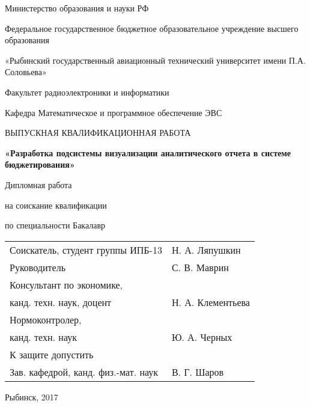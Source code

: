 \documentclass[a4paper]{extarticle}
\begin{document}
\begin{titlepage}
\centering
\large Министерство образования и науки РФ\par
\large Федеральное государственное бюджетное образовательное учреждение высшего образования\par
\large «Рыбинский государственный авиационный технический университет имени П.А. Соловьева»\par\vspace{1cm}

\large Факультет радиоэлектроники и информатики\par
\large Кафедра Математическое и программное обеспечение ЭВС\par\vspace{1cm}

\Large ВЫПУСКНАЯ КВАЛИФИКАЦИОННАЯ РАБОТА\par
\large\textbf{«Разработка подсистемы визуализации аналитического отчета в системе бюджетирования»}\par\vspace{1cm}
\Large Дипломная работа\par\vspace{1cm}

\raggedright
\large{на соискание квалификации}\par
\large{по специальности Бакалавр}\par\vspace{1cm}

\begin{tabu}{X[l] X[r]}
\large{Соискатель, студент группы ИПБ-13} & \large{Н. А. Ляпушкин}\par\\
\large{Руководитель} & \large{С. В. Маврин}\par\\
\large{Консультант по экономике,} & \large{}\par\\
\large{канд. техн. наук, доцент} & \large{Н. А. Клементьева}\par\\
\large{Нормоконтролер,} & \large{}\par\\
\large{канд. техн. наук} & \large{Ю. А. Черных}\par\\
\large{К защите допустить} & \large{}\par\\
\large{Зав. кафедрой, канд. физ.-мат. наук	} & \large{В. Г. Шаров}\par\\
\end{tabu}
\vspace*{\fill}\centering\large{Рыбинск, 2017}
\end{titlepage}
\end{document}
